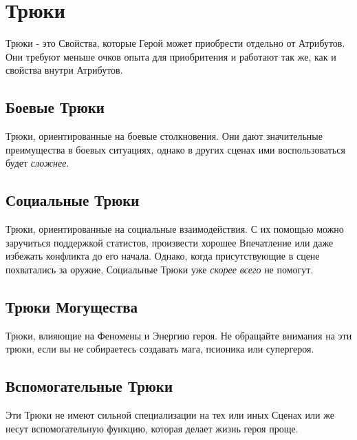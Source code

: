 \section{Трюки}
Трюки - это Свойства, которые Герой может приобрести отдельно от Атрибутов. Они требуют меньше очков опыта для приобритения и работают так же, как и свойства внутри Атрибутов.

\subsection{Боевые Трюки}
Трюки, ориентированные на боевые столкновения. Они дают значительные преимущества в боевых ситуациях, однако в других сценах ими воспользоваться будет \textit{сложнее}.

\subsection{Социальные Трюки}
Трюки, ориентированные на социальные взаимодействия. С их помощью можно заручиться поддержкой статистов, произвести хорошее Впечатление или даже избежать конфликта до его начала. Однако, когда присутствующие в сцене похватались за оружие, Социальные Трюки уже \textit{скорее всего} не помогут.

\subsection{Трюки Могущества}
Трюки, влияющие на Феномены и Энергию героя. Не обращайте внимания на эти трюки, если вы не собираетесь создавать мага, псионика или супергероя.

\subsection{Вспомогательные Трюки}
Эти Трюки не имеют сильной специализации на тех или иных Сценах или же несут вспомогательную функцию, которая делает жизнь героя проще.

\printindex[tricks]